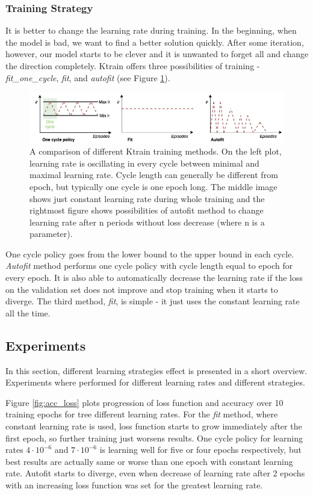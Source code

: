 \subsubsection{Training Strategy}
It is better to change the learning rate during training. In the beginning, when the model is bad, we want to find a better solution quickly. After some iteration, however, our model starts to be clever and it is unwanted to forget all and change the direction completely. Ktrain offers three possibilities of training - \textit{fit\_one\_cycle}, \textit{fit}, and \textit{autofit} (see Figure \ref{fig:strategies}).
\begin{figure}
\centering
\includegraphics[width=1\textwidth]{diagrams/strategies.jpg}
\caption{
A comparison of different Ktrain training methods. On the left plot, learning rate is oscillating in every cycle between minimal and maximal learning rate. Cycle length can generally be different from epoch, but typically one cycle is one epoch long. The middle image shows just constant learning rate during whole training and the rightmost figure shows possibilities of autofit method to change learning rate after n periods without loss decrease (where n is a parameter).  
}
\label{fig:strategies}
\end{figure}
 One cycle policy \cite{smith2018disciplined}goes from the lower bound to the upper bound in each cycle.
\textit{Autofit} method performs one cycle policy with cycle length equal to epoch for every epoch. It is also able to automatically decrease the learning rate if the loss on the validation set does not improve and stop training when it starts to diverge. The third method, \textit{fit}, is simple - it just uses the constant learning rate all the time.

\subsection{Experiments}
\label{sec:experiments}
In this section, different learning strategies effect is presented in a short overview. 
Experiments where performed for different learning rates and different strategies. 

Figure \ref{fig:acc_loss} plots progression of loss function and accuracy over 10 training epochs for tree different learning rates. For the \textit{fit} method, where constant learning rate is used, loss function starts to grow immediately after the first epoch, so further training just worsens results. One cycle policy for learning rates $4\cdot10^{-6}$ and $7\cdot10^{-6}$ is learning well for five or four epochs respectively, but best results are actually same or worse than one epoch with constant learning rate. Autofit starts to diverge, even when decrease of learning rate after 2 epochs with an increasing loss function was set for the greatest learning rate.

